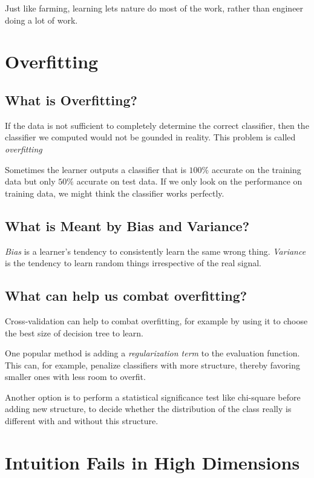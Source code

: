 \documentclass[10pt]{article}
\begin{document}
Just like farming, learning lets nature do most of the work, rather than
engineer doing a lot of work.

\section{Overfitting}

\subsection{What is Overfitting?}

If the data is not sufficient to completely determine the correct classifier,
then the classifier we computed would not be gounded in reality. This problem
is called \emph{overfitting}

Sometimes the learner outputs a classifier that is $100\%$ accurate on the
training data but only $50\%$ accurate on test data. If we only look on the
performance on training data, we might think the classifier works perfectly.

\subsection{What is Meant by Bias and Variance?}

\emph{Bias} is a learner’s tendency to consistently learn the same wrong thing.
\emph{Variance} is the tendency to learn random things irrespective of the real
signal.

\subsection{What can help us combat overfitting?}

Cross-validation can help to combat overfitting, for example by using it to
choose the best size of decision tree to learn.

One popular method is adding a \emph{regularization term} to the evaluation
function. This can, for example, penalize classifiers with more structure,
thereby favoring smaller ones with less room to overfit.

Another option is to perform a statistical significance test like chi-square
before adding new structure, to decide whether the distribution of the class
really is different with and without this structure.

\section{Intuition Fails in High Dimensions}
\end{document}
